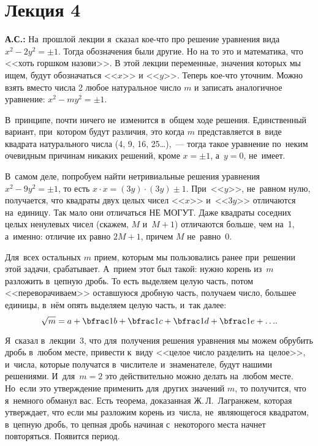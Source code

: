 \section{Лекция 4}
\label{1.4}

\textbf{А.С.:} На~прошлой лекции я~сказал кое-что про решение уравнения вида $x^{2}-2y^{2} = \pm
1$.  Тогда обозначения были другие. Но на то это и математика, что <<хоть горшком назови>>. В этой
лекции переменные, значения которых мы ищем, будут обозначаться <<$x$>> и <<$y$>>. Теперь кое-что уточним.
Можно взять вместо числа 2 любое натуральное число $m$ и записать аналогичное уравнение:
$x^{2}-my^{2}= \pm 1$.


В~принципе, почти ничего не~изменится в~общем ходе решения. Единственный вариант, при~котором будут
различия, это когда $m$ представляется в~виде квадрата натурального числа (4, 9, 16, 25\ldots),~---
тогда такое уравнение по~неким очевидным причинам никаких решений, кроме $x=\pm 1$, а~$y=0$, не~имеет.

В~самом деле, попробуем найти нетривиальные решения уравнения $x^{2}-9y^{2} = \pm 1$, то есть $x\cdot x =
(3y)\cdot (3y) \pm 1$. При~<<$y$>>, не~равном нулю, получается, что квадраты двух целых чисел <<$x$>> и~<<$3y$>>
отличаются на~единицу. Так мало они отличаться НЕ МОГУТ. Даже квадраты соседних целых ненулевых
чисел (скажем, $M$ и~$M+1$) отличаются больше, чем на~1, а~именно: отличие их равно $2M+1$, причем
$M$ не~равно~0.

Для~всех остальных $m$ прием, которым мы пользовались ранее при~решении этой задачи, срабатывает.
А~прием этот был такой: нужно корень из~$m$ разложить в~цепную дробь. То есть выделяем целую часть,
потом <<переворачиваем>> оставшуюся дробную часть, получаем число, большее единицы, в~нём опять
выделяем целую часть, и~так далее:
$$
\sqrt m=
a+\bfrac1{b+\bfrac1{c+\bfrac1{d+\bfrac1{e+\ldots}}}}.
$$

Я~сказал в~лекции~3, что для~получения решения уравнения мы можем обрубить дробь в~любом месте,
привести к~виду <<целое число разделить на~целое>>, и~числа, которые получатся в~числителе
и~знаменателе, будут нашими решениями. И~для~$m=2$ это действительно можно делать на~любом месте.
Но~если это утверждение применить для~других значений $m$, то получится, что я~немного обманул вас.
Есть теорема, доказанная Ж.\,Л.~Лагранжем, которая утверждает, что если мы разложим корень из~числа,
не~являющегося квадратом, в~цепную дробь, то цепная дробь начиная с~некоторого места начнет
повторяться. Появится период.

\medskip

